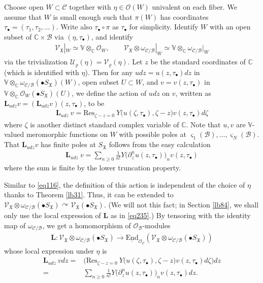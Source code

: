 \documentclass[12pt,a4paper,notitlepage]{report}
\theoremstyle{definition}
\theoremstyle{plain}
\newcommand{\fk}{\mathfrak}
\newcommand{\mc}{\mathcal}
\newcommand{\End}{\mathrm{End}} %
\newcommand{\Res}{\mathrm{Res}}
\newcommand{\scr}{\mathscr}
\newcommand{\sgm}{\varsigma}
\newcommand{\SX}{S_{\fk X}}
\newcommand{\mbf}{\mathbf}
\newcommand{\blt}{\bullet}
\newcommand{\Vbb}{\mathbb V}
\newcommand{\Cbb}{\mathbb C}
\numberwithin{equation}{section}
\begin{document}
Choose open $W\subset\mc C$  together with $\eta\in\scr O(W)$ univalent on each fiber. We assume that $W$ is small enough such that $\pi(W)$ has coordinates $\tau_\blt=(\tau_1,\tau_2,\dots)$. Write also $\tau_\blt\circ\pi$ as $\tau_\blt$ for simplicity. Identify $W$ with an open subset of $\Cbb\times\mc B$ via $(\eta,\tau_\blt)$, and identify 
\begin{gather*}
\scr V_{\fk X}|_W\simeq \Vbb\otimes_\Cbb\scr O_W,\qquad \scr V_{\fk X}\otimes\omega_{\mc C/\mc B}|_W\simeq \Vbb\otimes_\Cbb\omega_{\mc C/\mc B}|_W
\end{gather*}
via the trivialization $\mc U_\varrho(\eta)=\mc V_\varrho(\eta)$. Let $z$ be the standard coordinates of $\Cbb$ (which is identified with $\eta$). Then for any $udz=u(z,\tau_\blt)dz$ in $\Vbb\otimes_\Cbb\omega_{\mc C/\mc B}(\blt S_{\fk X})(W)$, open subset $U\subset W$, and $v=v(z,\tau_\blt)$ in $\Vbb\otimes_\Cbb\scr O_W(\blt S_{\fk X})(U)$, we define the action of $udz$ on $v$,  written as  $\mbf L_{udz} v=(\mbf L_{udz} v)(z,\tau_\blt)$, to be
\begin{align}
\mbf L_{udz}~v=\Res_{\zeta-z=0}~Y\big(u(\zeta,\tau_\blt),\zeta-z\big)v(z,\tau_\blt) d\zeta \label{eq148}
\end{align}
where $\zeta$ is another distinct standard complex variable of $\Cbb$. Note that $u,v$ are $\Vbb$-valued meromorphic functions on $W$ with possible poles at $\sgm_1(\mc B),\dots,\sgm_N(\mc B)$. That $\mbf L_{udz}v$ has finite poles at $\SX$ follows from the easy calculation
\begin{align}
\mbf L_{udz}~v=\sum_{n\geq 0}\frac 1{n!}Y\big(\partial_z^n u(z,\tau_\blt) \big)_n v(z,\tau_\blt)\label{eq235}
\end{align}
where the sum is finite by the lower truncation property.

Similar to \eqref{eq116}, the definition of this action is independent of the choice of $\eta$ thanks to Theorem \ref{lb31}. Thus,  it can be extended to $\scr V_{\fk X}\otimes\omega_{\mc C/\mc B}(\blt S_{\fk X})\curvearrowright \scr V_{\fk X}(\blt S_{\fk X})$. (We will not this fact; in Section \ref{lb84}, we shall only use the local expression of $\mbf L$ as in \eqref{eq235}.) By tensoring with the identity map of $\omega_{\mc C/\mc B}$, we get a homomorphism of $\scr O_{\mc B}$-modules
\begin{align*}
\mbf L:\scr V_{\fk X}\otimes\omega_{\mc C/\mc B}(\blt S_{\fk X})\rightarrow\underline{\End}_{\scr O_{\mc C}}(\scr V_{\fk X}\otimes\omega_{\mc C/\mc B}(\blt S_{\fk X}))
\end{align*}
whose local expression under $\eta$ is
\begin{align}
\mbf L_{udz}~vdz=&\Big(\Res_{\zeta-z=0}~Y\big(u(\zeta,\tau_\blt),\zeta-z\big)v(z,\tau_\blt) d\zeta\Big)dz\nonumber\\
=&\sum_{n\geq 0}\frac 1{n!}Y\big(\partial_z^n u(z,\tau_\blt) \big)_n v(z,\tau_\blt)dz.\label{eq149}
\end{align}
\end{document}
